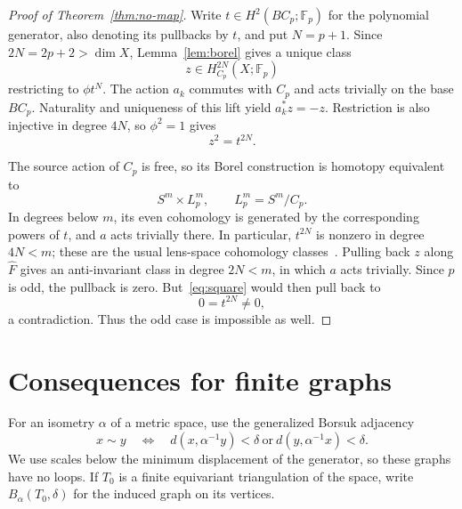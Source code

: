 \documentclass[11pt]{amsart}
\theoremstyle{remark}
\numberwithin{equation}{section}
\newcommand{\F}{\mathbb F}
\begin{document}
\begin{proof}[Proof of Theorem~\ref{thm:no-map}]
Write $t\in H^2(BC_p;\F_p)$ for the polynomial generator, also denoting its pullbacks by $t$, and put $N=p+1$. Since $2N=2p+2>\dim X$, Lemma~\ref{lem:borel} gives a unique class
\[
 z\in H_{C_p}^{2N}(X;\F_p)
\]
restricting to $\phi t^N$. The action $a_k$ commutes with $C_p$ and acts trivially on the base $BC_p$. Naturality and uniqueness of this lift yield $a_k^*z=-z$. Restriction is also injective in degree $4N$, so $\phi^2=1$ gives
\begin{equation}\label{eq:square}
 z^2=t^{2N}.
\end{equation}

The source action of $C_p$ is free, so its Borel construction is homotopy equivalent to
\[
 S^m\times L_p^m,\qquad L_p^m=S^m/C_p.
\]
In degrees below $m$, its even cohomology is generated by the corresponding powers of $t$, and $a$ acts trivially there. In particular, $t^{2N}$ is nonzero in degree $4N<m$; these are the usual lens-space cohomology classes~\cite[Example~3.41]{HatcherAT}. Pulling back $z$ along $\widehat F$ gives an anti-invariant class in degree $2N<m$, in which $a$ acts trivially. Since $p$ is odd, the pullback is zero. But~\eqref{eq:square} would then pull back to
\[
 0=t^{2N}\neq0,
\]
a contradiction. Thus the odd case is impossible as well.
\end{proof}

\section{Consequences for finite graphs}\label{sec:graphs}

For an isometry $\alpha$ of a metric space, use the generalized Borsuk adjacency
\[
 x\sim y\quad\Longleftrightarrow\quad
 d(x,\alpha^{-1}y)<\delta
 \ \text{or}\ d(y,\alpha^{-1}x)<\delta.
\]
We use scales below the minimum displacement of the generator, so these graphs have no loops. If $T_0$ is a finite equivariant triangulation of the space, write $B_\alpha(T_0,\delta)$ for the induced graph on its vertices.
\end{document}
